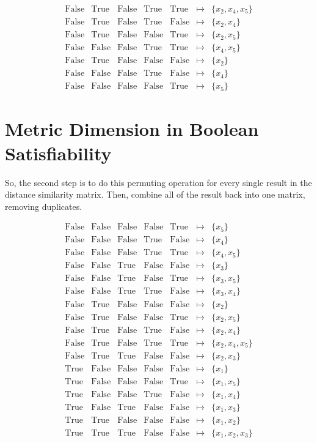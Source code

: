 \documentclass[12pt]{article}
\def\True{\mathrm{True}}
\def\False{\mathrm{False}}
\begin{document}
\[
\begin{array}{ccccccl}
	\False &  \True & \False &  \True &  \True & \mapsto & \{x_2, x_4, x_5\} \\
	\False &  \True & \False &  \True & \False & \mapsto & \{x_2, x_4\} \\
	\False &  \True & \False & \False &  \True & \mapsto & \{x_2, x_5\} \\
	\False & \False & \False &  \True &  \True & \mapsto & \{x_4, x_5\} \\
	\False &  \True & \False & \False & \False & \mapsto & \{x_2\} \\
	\False & \False & \False &  \True & \False & \mapsto & \{x_4\} \\
	\False & \False & \False & \False &  \True & \mapsto & \{x_5\}
\end{array}
\]

\newpage
\section*{Metric Dimension in Boolean Satisfiability}

So, the second step is to do this permuting operation for every single result in the distance similarity matrix. Then, combine all of the result back into one matrix, removing duplicates.

\[
\begin{array}{ccccccl}
	\False & \False & \False & \False &  \True & \mapsto & \{x_5\} \\
	\False & \False & \False &  \True & \False & \mapsto & \{x_4\} \\
	\False & \False & \False &  \True &  \True & \mapsto & \{x_4, x_5\} \\
	\False & \False &  \True & \False & \False & \mapsto & \{x_3\} \\
	\False & \False &  \True & \False &  \True & \mapsto & \{x_3, x_5\} \\
	\False & \False &  \True &  \True & \False & \mapsto & \{x_3, x_4\} \\
	\False &  \True & \False & \False & \False & \mapsto & \{x_2\} \\
	\False &  \True & \False & \False &  \True & \mapsto & \{x_2, x_5\} \\
	\False &  \True & \False &  \True & \False & \mapsto & \{x_2, x_4\} \\
	\False &  \True & \False &  \True &  \True & \mapsto & \{x_2, x_4, x_5\} \\
	\False &  \True &  \True & \False & \False & \mapsto & \{x_2, x_3\} \\
	 \True & \False & \False & \False & \False & \mapsto & \{x_1\} \\
	 \True & \False & \False & \False &  \True & \mapsto & \{x_1, x_5\} \\
	 \True & \False & \False &  \True & \False & \mapsto & \{x_1, x_4\} \\
	 \True & \False &  \True & \False & \False & \mapsto & \{x_1, x_3\} \\
	 \True &  \True & \False & \False & \False & \mapsto & \{x_1, x_2\} \\
	 \True &  \True &  \True & \False & \False & \mapsto & \{x_1, x_2, x_3\}
\end{array}
\]
\end{document}
